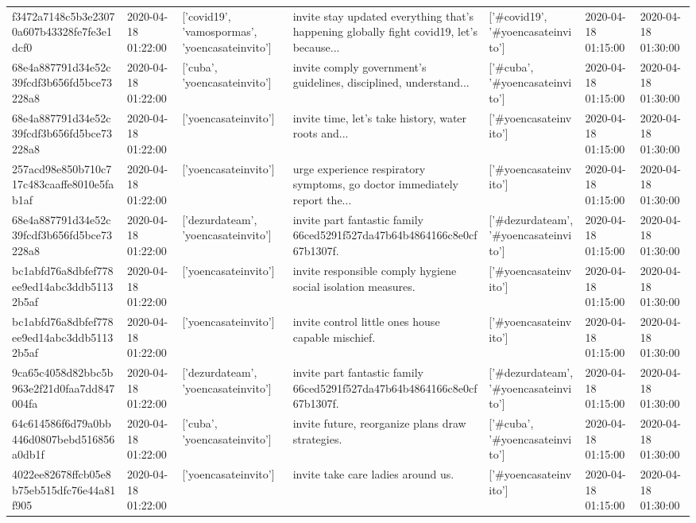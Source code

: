 \begin{tabular}{lllllll}
f3472a7148c5b3e23070a607b43328fe7fe3e1dcf0 & 2020-04-18 01:22:00 & ['covid19', 'vamospormas', 'yoencasateinvito'] & invite stay updated everything that's happening globally fight covid19, let's because... & ['#covid19', '#yoencasateinvito'] & 2020-04-18 01:15:00 & 2020-04-18 01:30:00 \\
68e4a887791d34e52c39fcdf3b656fd5bce73228a8 & 2020-04-18 01:22:00 & ['cuba', 'yoencasateinvito'] & invite comply government's guidelines, disciplined, understand... & ['#cuba', '#yoencasateinvito'] & 2020-04-18 01:15:00 & 2020-04-18 01:30:00 \\
68e4a887791d34e52c39fcdf3b656fd5bce73228a8 & 2020-04-18 01:22:00 & ['yoencasateinvito'] & invite time, let's take history, water roots and... & ['#yoencasateinvito'] & 2020-04-18 01:15:00 & 2020-04-18 01:30:00 \\
257acd98e850b710c717c483caaffe8010e5fab1af & 2020-04-18 01:22:00 & ['yoencasateinvito'] & urge experience respiratory symptoms, go doctor immediately report the... & ['#yoencasateinvito'] & 2020-04-18 01:15:00 & 2020-04-18 01:30:00 \\
68e4a887791d34e52c39fcdf3b656fd5bce73228a8 & 2020-04-18 01:22:00 & ['dezurdateam', 'yoencasateinvito'] & invite part fantastic family 66ced5291f527da47b64b4864166c8e0cf67b1307f. & ['#dezurdateam', '#yoencasateinvito'] & 2020-04-18 01:15:00 & 2020-04-18 01:30:00 \\
bc1abfd76a8dbfef778ee9ed14abc3ddb51132b5af & 2020-04-18 01:22:00 & ['yoencasateinvito'] & invite responsible comply hygiene social isolation measures. & ['#yoencasateinvito'] & 2020-04-18 01:15:00 & 2020-04-18 01:30:00 \\
bc1abfd76a8dbfef778ee9ed14abc3ddb51132b5af & 2020-04-18 01:22:00 & ['yoencasateinvito'] & invite control little ones house capable mischief. & ['#yoencasateinvito'] & 2020-04-18 01:15:00 & 2020-04-18 01:30:00 \\
9ca65c4058d82bbc5b963e2f21d0faa7dd847004fa & 2020-04-18 01:22:00 & ['dezurdateam', 'yoencasateinvito'] & invite part fantastic family 66ced5291f527da47b64b4864166c8e0cf67b1307f. & ['#dezurdateam', '#yoencasateinvito'] & 2020-04-18 01:15:00 & 2020-04-18 01:30:00 \\
64c614586f6d79a0bb446d0807bebd516856a0db1f & 2020-04-18 01:22:00 & ['cuba', 'yoencasateinvito'] & invite future, reorganize plans draw strategies. & ['#cuba', '#yoencasateinvito'] & 2020-04-18 01:15:00 & 2020-04-18 01:30:00 \\
4022ee82678ffcb05e8b75eb515dfc76e44a81f905 & 2020-04-18 01:22:00 & ['yoencasateinvito'] & invite take care ladies around us. & ['#yoencasateinvito'] & 2020-04-18 01:15:00 & 2020-04-18 01:30:00 \\

\end{tabular}
